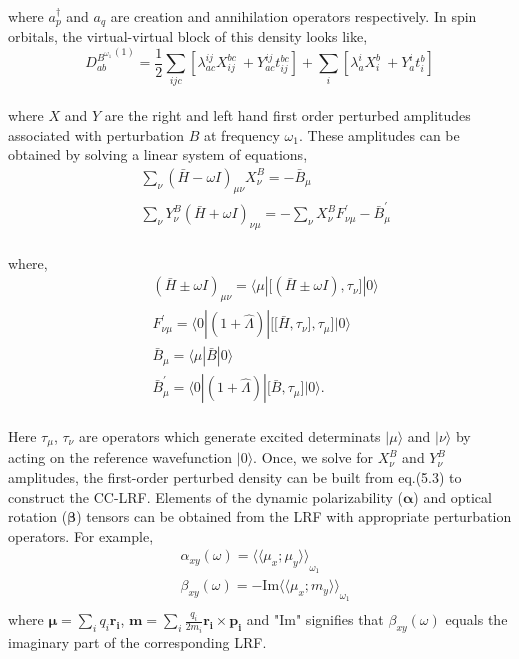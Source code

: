\\
where $a^{\dagger}_{p}$ and $a_q$ are creation and annihilation operators respectively. 
In spin orbitals, the virtual-virtual block of this density looks like,
\\
\begin{equation}
{D^{B^{\omega_1}}_{ab}}^{(1)}= \frac{1}{2}\sum_{ijc}[\lambda^{ij}_{ac}X^{bc}_{ij} \
+ Y^{ij}_{ac}t^{bc}_{ij}] + \sum_i[\lambda^{i}_{a}X^{b}_{i}\
 + Y^{i}_{a}t^{b}_{i}] 
\end{equation}
\\
where $X$ and $Y$ are the right and left hand first order perturbed amplitudes associated with 
perturbation $B$ at frequency $\omega_1$. These amplitudes can be obtained 
by solving a linear system of equations,  
\\
\begin{equation}
\begin{split}
& \sum_\nu{(\bar{H} - \omega I)}_{\mu\nu}X_{\nu}^{B} = -\bar{B}_{\mu} \\
&\sum_\nu Y_{\nu}^{B}{(\bar{H} + \omega I)}_{\nu\mu}
= -  \sum_\nu X_{\nu}^{B} F^{'}_{\nu\mu} - \bar{B}^{'}_{\mu}
\end{split}
\end{equation}
\\
where,
\begin{equation}
\begin{split}
&{(\bar{H} \pm \omega I)}_{\mu\nu} = \langle \mu | \big[(\bar{H} \pm \omega I),\tau_\nu\big] |0\rangle\\
&F^{'}_{\nu\mu} = \langle 0|(1 + \hat{\Lambda})|\big[\big[\bar{H},\tau_\nu\big],\tau_\mu\big] |0 \rangle\\ 
&\bar{B}_{\mu} = \langle \mu|\bar{B}|0 \rangle \\
& \bar{B}^{'}_{\mu} = \langle 0|(1 + \hat{\Lambda})|\big[\bar{B},\tau_\mu\big] |0 \rangle.
\end{split}
\end{equation}
\\
Here $\tau_\mu$, $\tau_\nu$ are operators which generate excited determinats $|\mu\rangle$
and $|\nu\rangle$ by acting on the reference wavefunction $|0\rangle$. Once, we solve for 
$X_{\nu}^{B}$ and $Y_{\nu}^{B}$ amplitudes, the first-order perturbed density can be built 
from eq.(5.3) to construct the CC-LRF. Elements of the dynamic polarizability ($\bm{\alpha}$) 
and optical rotation ($\bm{\beta}$) tensors can be obtained from the LRF with appropriate 
perturbation operators. For example,
\begin{equation}
\begin{split}
& \alpha_{xy}(\omega) = {\langle\langle \mu_x;\mu_y\rangle\rangle}_{\omega_1}\\
&\beta_{xy}(\omega) = {-\text{Im} \langle\langle \mu_x;m_y\rangle\rangle}_{\omega_1} \\
\end{split}
\end{equation}
where $\bm{\mu} = \sum_i q_i \bm{r_i} $, $\bm{m} = \sum_i \frac{q_i}{2m_i} \bm{r_i} \times \bm{p_i}$
and "Im" signifies that $\beta_{xy}(\omega)$ equals the imaginary part of the corresponding LRF.
